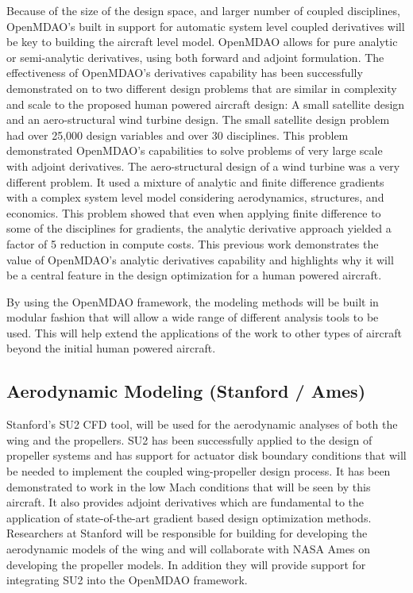 \documentclass[]{aiaa-tc}
\begin{document}
    Because of the size of the design space, and larger number of coupled disciplines, OpenMDAO's built in support for 
    automatic system level coupled derivatives will be key to building the aircraft level model. OpenMDAO allows for 
    pure analytic or semi-analytic derivatives, using both forward and adjoint formulation. The effectiveness of OpenMDAO's 
    derivatives capability has been successfully demonstrated on to two different design problems that are similar in complexity 
    and scale to the proposed human powered aircraft design: A small satellite design and an aero-structural 
    wind turbine design\cite{gray2014derivatives}. The small satellite design problem had over 25,000 design variables 
    and over 30 disciplines. This problem demonstrated OpenMDAO's capabilities to solve problems of very large scale with adjoint 
    derivatives. The aero-structural design of a wind turbine was a very different problem. It used a mixture of analytic and 
    finite difference gradients with a complex system level model considering aerodynamics, structures, and economics. 
    This problem showed that even when applying finite difference to some of the disciplines for gradients, the analytic 
    derivative approach yielded a factor of 5 reduction in compute costs. This previous work demonstrates the 
    value of OpenMDAO's analytic derivatives capability and highlights why it will be a central feature in the design 
    optimization for a human powered aircraft. 

    By using the OpenMDAO framework, the modeling methods will be built in modular fashion that will allow a wide range of
    different analysis tools to be used. This will help extend the applications of the work to other types of aircraft beyond the 
    initial human powered aircraft. 

    \subsection{Aerodynamic Modeling (Stanford / Ames)}

    Stanford's SU2 CFD tool, will be used for the aerodynamic analyses of both the wing and 
    the propellers. SU2 has been successfully applied to the design of propeller systems 
    and has support for actuator disk boundary conditions that will be needed to implement 
    the coupled wing­-propeller design process. It has been demonstrated to work in the low 
    Mach conditions that will be seen by this aircraft. It also provides adjoint derivatives 
    which are fundamental to the application of state­-of-­the-­art gradient based design 
    optimization methods. Researchers at Stanford will be responsible for building for developing 
    the aerodynamic models of the wing and will collaborate with NASA Ames on developing the 
    propeller models. In addition they will provide support for integrating SU2 into the OpenMDAO 
    framework. 
\end{document}
